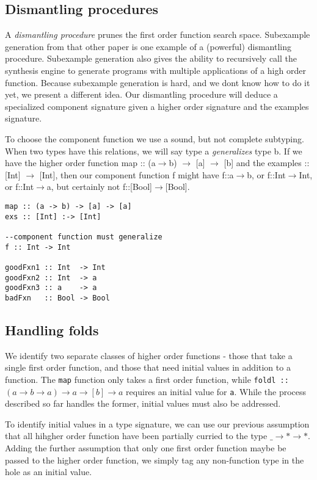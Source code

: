 \subsection{Dismantling procedures}

A \textit{dismantling procedure} prunes the first order function search space.
Subexample generation from that other paper\cite{isil} is one example of a (powerful) dismantling procedure. Subexample generation also gives the ability to recursively call the synthesis engine to generate programs with multiple applications of a high order function.
Because subexample generation is hard, and we dont know how to do it yet, we present a different idea.
Our dismantling procedure will deduce a specialized component signature given a higher order signature and the examples signature.

To choose the component function we use a sound, but not complete subtyping.
When two types have this relations, we will say type a \textit{generalizes} type b.
If we have the higher order function map :: (a$\to$b) $\to$ [a] $\to$ [b] and the examples :: [Int] $\to$ [Int], then our component function f might have f::a$\to$b, or f::Int$\to$Int, or f::Int$\to$a, but certainly not f::[Bool]$\to$[Bool].

\begin{verbatim}
map :: (a -> b) -> [a] -> [a]
exs :: [Int] :-> [Int]

--component function must generalize
f :: Int -> Int

goodFxn1 :: Int  -> Int
goodFxn2 :: Int  -> a
goodFxn3 :: a    -> a
badFxn   :: Bool -> Bool
\end{verbatim}

\subsection{Handling folds}
We identify two separate classes of higher order functions - those that take a single first order function, and those that need initial values in addition to a function. The \texttt{map} function only takes a first order function, while \texttt{foldl :: $(a\to b\to a)\to a\to [b]\to a$} requires an initial value for \texttt{a}. While the process described so far handles the former, initial values must also be addressed.

To identify initial values in a type signature, we can use our previous assumption that all hihgher order function have been partially curried to the type \texttt{$\_\to *\to*$}. Adding the further assumption that only one first order function maybe be passed to the higher order function, we simply tag any non-function type in the hole as an initial value. 

